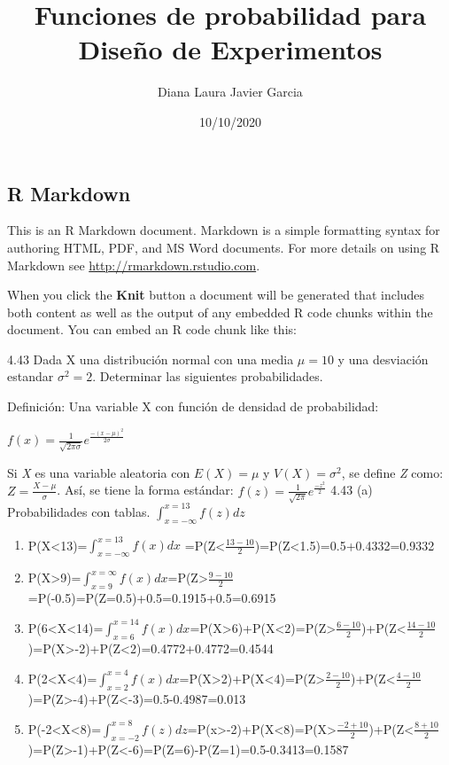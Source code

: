 \documentclass[
]{article}
\title{Funciones de probabilidad para Diseño de Experimentos}
\author{Diana Laura Javier Garcia}
\date{10/10/2020}
\begin{document}
\maketitle

\hypertarget{r-markdown}{%
\subsection{R Markdown}\label{r-markdown}}

This is an R Markdown document. Markdown is a simple formatting syntax
for authoring HTML, PDF, and MS Word documents. For more details on
using R Markdown see \url{http://rmarkdown.rstudio.com}.

When you click the \textbf{Knit} button a document will be generated
that includes both content as well as the output of any embedded R code
chunks within the document. You can embed an R code chunk like this:

4.43 Dada X una distribución normal con una media \(\mu=10\) y una
desviación estandar \(\sigma^{2}=2\). Determinar las siguientes
probabilidades.

Definición: Una variable X con función de densidad de probabilidad:

\(f(x)=\frac{1}{\sqrt{2 \pi \sigma}}e^{\frac{-(x-\mu)^{2}}{2 \sigma}}\)

Si \emph{X} es una variable aleatoria con \(E(X)=\mu\) y
\(V(X)=\sigma^{2}\), se define \emph{Z} como:
\(Z=\frac{X-\mu}{\sigma}\). Así, se tiene la forma estándar:
\(f(z)=\frac{1}{\sqrt{2 \pi }}e^{\frac{-z^{2}}{2}}\) 4.43 (a)
Probabilidades con tablas. \(\int_{x=-\infty}^{x=13} f(z) dz\)

\begin{enumerate}
\def\labelenumi{(\alph{enumi})}
\item
  P(X\textless13)=\(\int_{x=-\infty}^{x=13} f(x) dx\)
  =P(Z\textless{}\(\frac{13-10}{2}\))=P(Z\textless1.5)=0.5+0.4332=0.9332
\item
  P(X\textgreater9)=\(\int_{x=9}^{x=\infty} f(x) dx\)=P(Z\textgreater{}\(\frac{9-10}{2}\)=P(-0.5)=P(Z=0.5)+0.5=0.1915+0.5=0.6915
\item
  P(6\textless X\textless14)=\(\int_{x=6}^{x=14} f(x) dx\)=P(X\textgreater6)+P(X\textless2)=P(Z\textgreater{}\(\frac{6-10}{2}\))+P(Z\textless{}\(\frac{14-10}{2}\))=P(X\textgreater-2)+P(Z\textless2)=0.4772+0.4772=0.4544
\item
  P(2\textless X\textless4)=\(\int_{x=2}^{x=4} f(x) dx\)=P(X\textgreater2)+P(X\textless4)=P(Z\textgreater{}\(\frac{2-10}{2}\))+P(Z\textless{}\(\frac{4-10}{2}\))=P(Z\textgreater-4)+P(Z\textless-3)=0.5-0.4987=0.013
\item
  P(-2\textless X\textless8)=\(\int_{x=-2}^{x=8} f(z) dz\)=P(x\textgreater-2)+P(X\textless8)=P(X\textgreater{}\(\frac{-2+10}{2}\))+P(Z\textless{}\(\frac{8+10}{2}\))=P(Z\textgreater-1)+P(Z\textless-6)=P(Z=6)-P(Z=1)=0.5-0.3413=0.1587
\end{enumerate}
\end{document}
